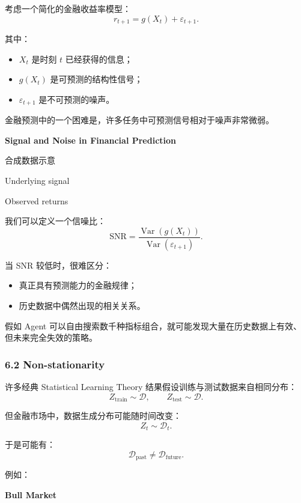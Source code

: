考虑一个简化的金融收益率模型：
\[r_{t+1}=g(X_t)+\varepsilon_{t+1}.\]

其中：

\begin{itemize}
\tightlist
\item
  \(X_t\) 是时刻 \(t\) 已经获得的信息；
\item
  \(g(X_t)\) 是可预测的结构性信号；
\item
  \(\varepsilon_{t+1}\) 是不可预测的噪声。
\end{itemize}

金融预测中的一个困难是，许多任务中可预测信号相对于噪声非常微弱。

\textbf{Signal and Noise in Financial Prediction}

合成数据示意


Underlying signal

Observed returns

我们可以定义一个信噪比：
\[\mathrm{SNR}
=
\frac{\operatorname{Var}(g(X_t))}
{\operatorname{Var}(\varepsilon_{t+1})}.\]

当 SNR 较低时，很难区分：

\begin{itemize}
\tightlist
\item
  真正具有预测能力的金融规律；
\item
  历史数据中偶然出现的相关关系。
\end{itemize}

假如 Agent 可以自由搜索数千种指标组合，就可能发现大量在历史数据上有效、但未来完全失效的策略。

\hypertarget{part-1-03-0001-non-stationarity}{%
\subsubsection{6.2 Non-stationarity}\label{part-1-03-0001-non-stationarity}}

许多经典 Statistical Learning Theory 结果假设训练与测试数据来自相同分布：
\[Z_{\mathrm{train}}\sim\mathcal D,
\qquad
Z_{\mathrm{test}}\sim\mathcal D.\]

但金融市场中，数据生成分布可能随时间改变：
\[Z_t\sim\mathcal D_t.\]

于是可能有：
\[\mathcal D_{\mathrm{past}}
\neq
\mathcal D_{\mathrm{future}}.\]

例如：

\textbf{Bull Market}


